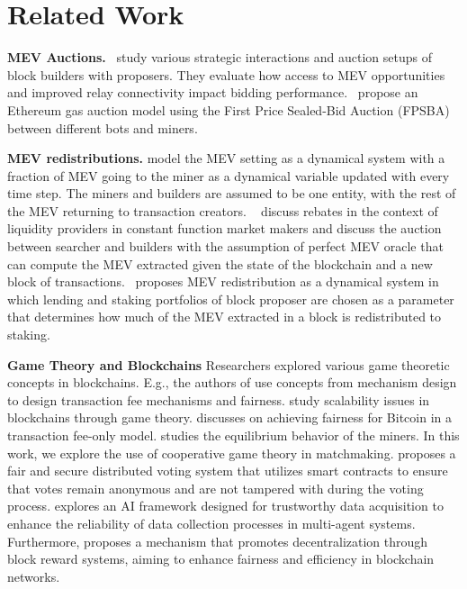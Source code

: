 \section{Related Work}
\label{sec:related}

\textbf{MEV Auctions.}~\cite{10634354} study various strategic interactions and auction setups of block builders with proposers. They evaluate how access to MEV opportunities and improved relay connectivity impact bidding performance.~\cite{10271857} propose an Ethereum gas auction model using the First Price Sealed-Bid Auction (FPSBA) between different bots and miners.

\noindent\textbf{MEV redistributions.}\cite{chionas2023gets} model the MEV setting as a dynamical system with a fraction of MEV going to the miner as a dynamical variable updated with every time step. The miners and builders are assumed to be one entity, with the rest of the MEV returning to transaction creators. ~\cite{mazorra2023towards} discuss rebates in the context of liquidity providers in constant function market makers and discuss the auction between searcher and builders with the assumption of perfect MEV oracle that can compute the MEV extracted given the state of the blockchain and a new block of transactions.~\cite{chitra2022improving} proposes MEV redistribution as a dynamical system in which lending and staking portfolios of block proposer are chosen as a parameter that determines how much of the MEV extracted in a block is redistributed to staking.

\noindent\textbf{Game Theory and Blockchains} Researchers explored various game theoretic concepts in blockchains. E.g., the authors of \cite{roughgarden, damle2024designing,damle2024no}  use concepts from mechanism design to design transaction fee mechanisms and fairness. \cite{jain2021we,chen2024game} study scalability issues in blockchains through game theory.\cite{siddiqui2020bitcoinf} discusses on achieving fairness for Bitcoin in a transaction fee-only model. \cite{jain2022tiramisu} studies the equilibrium behavior of the miners. In this work, we explore the use of cooperative game theory in matchmaking. \cite{damle2021fasten} proposes a fair and secure distributed voting system that utilizes smart contracts to ensure that votes remain anonymous and are not tampered with during the voting process. \cite{faltings2021orthos} explores an AI framework designed for trustworthy data acquisition to enhance the reliability of data collection processes in multi-agent systems. Furthermore, \cite{srivastava2024decent} proposes a mechanism that promotes decentralization through block reward systems, aiming to enhance fairness and efficiency in blockchain networks.

